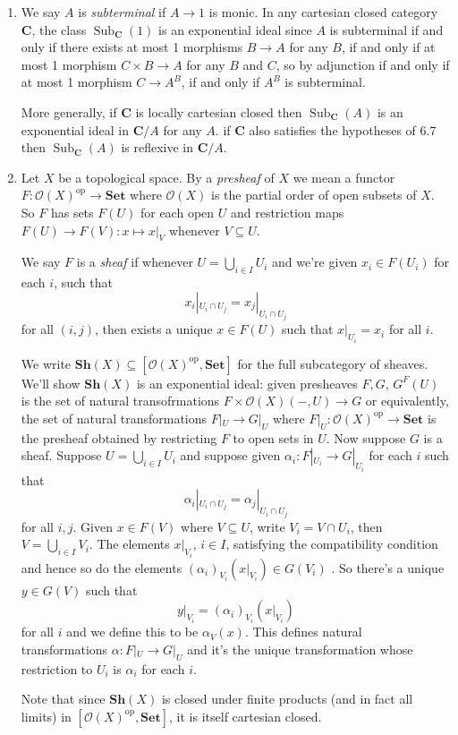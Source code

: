 \documentclass[a4paper]{article}
\renewcommand{\c}[1]{\mathbf{#1}}
\newcommand{\Set}{{\c{Set}}}
\newcommand{\Sh}{{\c{Sh}}}
\begin{document}
\begin{eg}\leavevmode
  \begin{enumerate}
  \item We say \(A\) is \emph{subterminal} if \(A \to 1\) is monic. In any cartesian closed category \(\c C\), the class \(\operatorname{Sub}_{\c C}(1)\) is an exponential ideal since \(A\) is subterminal if and only if there exists at most 1 morphisms \(B \to A\) for any \(B\), if and only if at most 1 morphism \(C \times B \to A\) for any \(B\) and \(C\), so by adjunction if and only if at most 1 morphism \(C \to A^B\), if and only if \(A^B\) is subterminal.

    More generally, if \(\c C\) is locally cartesian closed then \(\operatorname{Sub}_{\c C}(A)\) is an exponential ideal in \(\c C/A\) for any \(A\).  if \(\c C\) also satisfies the hypotheses of 6.7 then \(\operatorname{Sub}_{\c C}(A)\) is reflexive in \(\c C/A\).
  \item Let \(X\) be a topological space. By a \emph{presheaf} of \(X\) we mean a functor \(F: \mathcal O(X)^{\text{op}} \to \Set\) where \(\mathcal O(X)\) is the partial order of open subsets of \(X\). So \(F\) has sets \(F(U)\) for each open \(U\) and restriction maps \(F(U) \to F(V): x \mapsto x|_V\) whenever \(V \subseteq U\).

    We say \(F\) is a \emph{sheaf} if whenever \(U = \bigcup_{i \in I} U_i\) and we're given \(x_i \in F(U_i)\) for each \(i\), such that
    \[
      x_i|_{U_i \cap U_j} = x_j|_{U_i \cap U_j}
    \]
    for all \((i, j)\), then exists a unique \(x \in F(U)\) such that \(x|_{U_i} = x_i\) for all \(i\).

    We write \(\Sh(X) \subseteq [\mathcal O(X)^{\text{op}}, \Set]\) for the full subcategory of sheaves. We'll show \(\Sh(X)\) is an exponential ideal: given presheaves \(F, G\), \(G^F(U)\) is the set of natural transofrmations \(F \times \mathcal O(X) (-, U) \to G\) or equivalently, the set of natural transformations \(F|_U \to G|_U\) where \(F|_U: \mathcal O(X)^{\text{op}} \to \Set\) is the presheaf obtained by restricting \(F\) to open sets in \(U\). Now suppose \(G\) is a sheaf. Suppose \(U = \bigcup_{i \in I} U_i\) and suppose given \(\alpha_i: F|_{U_i} \to G|_{U_i}\) for each \(i\) such that
    \[
      \alpha_i|_{U_i \cap U_j} = \alpha_j|_{U_i \cap U_j}
    \]
    for all \(i, j\). Given \(x \in F(V)\) where \(V \subseteq U\), write \(V_i = V \cap U_i\), then \(V = \bigcup_{i \in I} V_i\). The elements \(x|_{V_i}\), \(i \in I\), satisfying the compatibility condition and hence so do the elements \((\alpha_i)_{V_i} (x|_{V_i}) \in G(V_i)\) . So there's a unique \(y \in G(V)\) such that
    \[
      y|_{V_i} = (\alpha_i)_{V_i} (x|_{V_i})
    \]
    for all \(i\) and we define this to be \(\alpha_V(x)\). This defines natural transformations \(\alpha: F|_U \to G|_U\) and it's the unique transformation whose restriction to \(U_i\) is \(\alpha_i\) for each \(i\).

    Note that since \(\Sh(X)\) is closed under finite products (and in fact all limits) in \([\mathcal O(X)^{\text{op}}, \Set]\), it is itself cartesian closed.
  \end{enumerate}
\end{eg}
\end{document}
